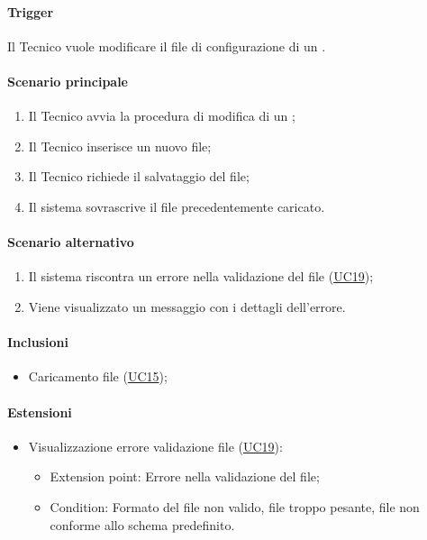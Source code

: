 \paragraph*{Trigger}
Il Tecnico vuole modificare il file di configurazione di un .

\paragraph*{Scenario principale}
\begin{enumerate}
  \item Il Tecnico avvia la procedura di modifica di un ;
  \item Il Tecnico inserisce un nuovo file;
  \item Il Tecnico richiede il salvataggio del file;
  \item Il sistema sovrascrive il file precedentemente caricato.
\end{enumerate}

\paragraph*{Scenario alternativo}
\begin{enumerate}
  \item Il sistema riscontra un errore nella validazione del file (\hyperref[UC19]{UC19});
  \item Viene visualizzato un messaggio con i dettagli dell'errore.
\end{enumerate}

\paragraph*{Inclusioni}
\begin{itemize}
  \item Caricamento file  (\hyperref[UC15]{UC15});
\end{itemize}

\paragraph*{Estensioni}
\begin{itemize}
  \item Visualizzazione errore validazione file (\hyperref[UC19]{UC19}):
  \begin{itemize}
    \item Extension point: Errore nella validazione del file;
    \item Condition: Formato del file non valido, file troppo pesante, file non conforme allo schema predefinito.
  \end{itemize}
\end{itemize}